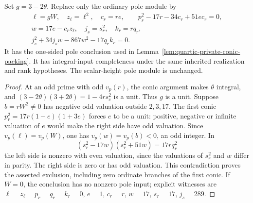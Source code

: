 \begin{proposition}
\label{lem:quartic-linear-pole}
Set $g=3-2\theta$. Replace only the ordinary pole module by
\begin{gather*}
 \ell=gW,\quad z_\ell=\ell^2,\quad c_r=re,\qquad
 p_r^2-17r-34c_r+51ec_r=0,\\
 w=17e-c_rz_\ell,\quad j_s=s_r^2,\quad k_r=rq_r,\\
 j_s^2+34j_sw-867w^2-17q_rk_r=0.
\end{gather*}
It has the one-sided pole conclusion used in
Lemma~\ref{lem:quartic-private-conic-packing}. It has integral-input
completeness under the same inherited realization and rank hypotheses.
The scalar-height pole module is unchanged.
\end{proposition}
\begin{proof}
At an odd prime with odd $v_p(r)$, the conic argument makes $\theta$
integral, and
$(3-2\theta)(3+2\theta)=1-4rs_c^2$ is a unit. Thus $g$ is a unit.
Suppose $b=rW^2\ne0$ has negative odd valuation outside $2,3,17$.
The first conic $p_r^2=17r(1-e)(1+3e)$ forces $e$ to be a unit: positive,
negative or infinite valuation of $e$ would make the right side have odd
valuation. Since $v_p(\ell)=v_p(W)$, one has
$v_p(w)=v_p(b)<0$, an odd integer. In
\[
 (s_r^2-17w)(s_r^2+51w)=17rq_r^2
\]
the left side is nonzero with even valuation, since the valuations of
$s_r^2$ and $w$ differ in parity. The right side is zero or has odd
valuation. This contradiction proves the asserted exclusion, including
zero ordinate branches of the first conic. If $W=0$, the conclusion has
no nonzero pole input; explicit witnesses are
$\ell=z_\ell=p_r=q_r=k_r=0$, $e=1$, $c_r=r$, $w=17$, $s_r=17$, $j_s=289$.


\end{proof}
